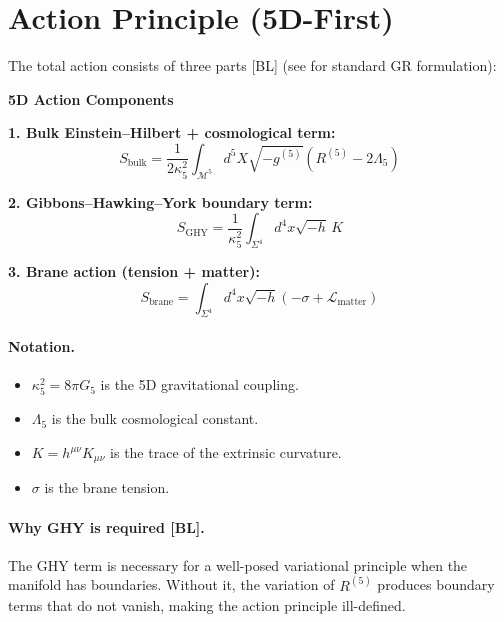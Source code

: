 \documentclass[11pt,a4paper]{article}
\newcommand{\tagBL}{\textcolor{blue!70!black}{[BL]}}
\begin{document}
\section{Action Principle (5D-First)}
\label{sec:action}

The total action consists of three parts \tagBL{} (see \cite{MTW,Wald} for standard GR formulation):

\begin{programbox}
\textbf{5D Action Components}

\textbf{1. Bulk Einstein--Hilbert + cosmological term:}
\begin{equation}
    S_{\mathrm{bulk}} = \frac{1}{2\kappa_5^2} \int_{\mathcal{M}^5} d^5X \sqrt{-g^{(5)}} \left( R^{(5)} - 2\Lambda_5 \right)
    \label{eq:S_bulk}
\end{equation}

\textbf{2. Gibbons--Hawking--York boundary term:}
\begin{equation}
    S_{\mathrm{GHY}} = \frac{1}{\kappa_5^2} \int_{\Sigma^4} d^4x \sqrt{-h} \, K
    \label{eq:S_GHY}
\end{equation}

\textbf{3. Brane action (tension + matter):}
\begin{equation}
    S_{\mathrm{brane}} = \int_{\Sigma^4} d^4x \sqrt{-h} \left( -\sigma + \mathcal{L}_{\mathrm{matter}} \right)
    \label{eq:S_brane}
\end{equation}
\end{programbox}

\paragraph{Notation.}
\begin{itemize}[nosep]
    \item $\kappa_5^2 = 8\pi G_5$ is the 5D gravitational coupling.
    \item $\Lambda_5$ is the bulk cosmological constant.
    \item $K = h^{\mu\nu} K_{\mu\nu}$ is the trace of the extrinsic curvature.
    \item $\sigma$ is the brane tension.
\end{itemize}

\paragraph{Why GHY is required \tagBL{}.}
The GHY term \cite{York1972,GH1977} is necessary for a well-posed variational principle when the manifold has boundaries.
Without it, the variation of $R^{(5)}$ produces boundary terms that do not vanish, making the action principle ill-defined.
\end{document}
